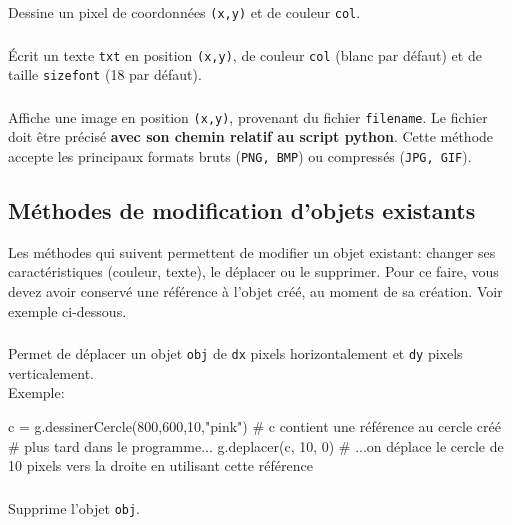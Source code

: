 \documentclass[11pt,a4paper]{article}
\begin{document}
\subsubsection*{}
Dessine un pixel de coordonnées {\tt (x,y)} et de couleur {\tt col}.

\subsubsection*{}
\'Ecrit un texte {\tt txt} en position {\tt (x,y)}, de couleur {\tt col} (blanc par défaut) et de taille {\tt sizefont} (18 par défaut).

\subsubsection*{}
Affiche une image en position {\tt (x,y)}, provenant du fichier {\tt filename}. Le fichier doit être précisé {\bf avec son chemin relatif au script python}. Cette méthode accepte les principaux formats bruts ({\tt PNG, BMP}) ou compressés ({\tt JPG, GIF}).

\subsection*{Méthodes de modification d'objets existants}
Les méthodes qui suivent permettent de modifier un objet existant: changer ses caractéristiques (couleur, texte), le déplacer ou le supprimer. Pour ce faire, vous devez avoir conservé une référence à l'objet créé, au moment de sa création. Voir exemple ci-dessous.
\subsubsection*{}
Permet de déplacer un objet {\tt obj} de {\tt dx} pixels horizontalement et {\tt dy} pixels verticalement.\\
Exemple:
\begin{ccode}
    c = g.dessinerCercle(800,600,10,"pink") # c contient une référence au cercle créé
    # plus tard dans le programme...
    g.deplacer(c, 10, 0) # ...on déplace le cercle de 10 pixels vers la droite en utilisant cette référence
\end{ccode}

\subsubsection*{}
Supprime l'objet {\tt obj}.
\end{document}

